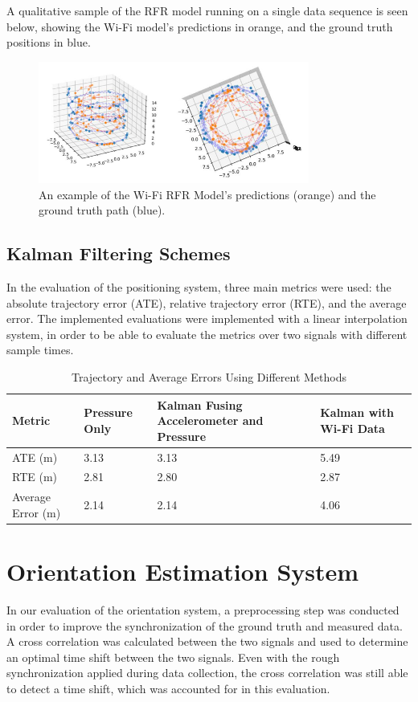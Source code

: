 A qualitative sample of the RFR model running on a single data sequence is seen below, showing the Wi-Fi model's predictions in orange, and the ground truth positions in blue.
\begin{figure}[h] 
	\centering \includegraphics[height=4cm]{./images/wifirf.png}
	\caption{An example of the Wi-Fi RFR Model's predictions (orange) and  the ground truth path (blue).}
\end{figure}

\subsection{Kalman Filtering Schemes}
In the evaluation of the positioning system, three main metrics were used: the absolute trajectory error (ATE), relative trajectory error (RTE), and the average error. \cite{rtabmap, yan_2019_ronin} The implemented evaluations were implemented with a linear interpolation system, in order to be able to evaluate the metrics over two signals with different sample times.

\begin{table}[h!]
\centering
\caption{Trajectory and Average Errors Using Different Methods}
\label{tab:trajectory_errors}
\setlength{\tabcolsep}{3pt} %
\small %
\begin{tabularx}{\columnwidth}{l X X X} %
\toprule
\textbf{Metric} & \textbf{Pressure Only} & 
\textbf{\centering Kalman Fusing Accelerometer and Pressure} & 
\textbf{Kalman with Wi-Fi Data} \\ 
\midrule
ATE (m) & 3.13 & 3.13 & 5.49 \\
RTE (m) & 2.81 & 2.80 & 2.87 \\
Average Error (m)             & 2.14 & 2.14 & 4.06 \\
\bottomrule
\end{tabularx}
\end{table}

\section{Orientation Estimation System}
In our evaluation of the orientation system, a preprocessing step was conducted in order to improve the synchronization of the ground truth and measured data. A cross correlation was calculated between the two signals and used to determine an optimal time shift between the two signals. Even with the rough synchronization applied during data collection, the cross correlation was still able to detect a time shift, which was accounted for in this evaluation.

